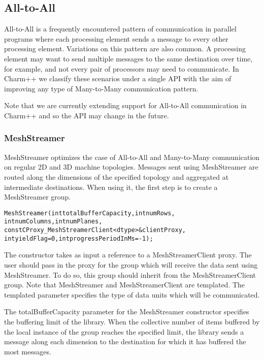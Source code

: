 \subsection{All-to-All}

All-to-All is a frequently encountered pattern of communication in
parallel programs where each processing element sends a message to
every other processing element. Variations on this pattern are also
common. A processing element may want to send multiple messages to the
same destination over time, for example, and not every pair of
processors may need to communicate. In Charm++ we classify these
scenarios under a single API with the aim of improving any type of
Many-to-Many communication pattern.

Note that we are currently extending support for All-to-All
communication in Charm++ and so the API may change in the
future. 

\subsubsection{MeshStreamer}

MeshStreamer optimizes the case of All-to-All and Many-to-Many
communication on regular 2D and 3D machine topologies. Messages sent
using MeshStreamer are routed along the dimensions of the specified
topology and aggregated at intermediate destinations. When using it,
the first step is to create a MeshStreamer group. 

\begin{alltt}
MeshStreamer(int totalBufferCapacity, int numRows, 
             int numColumns, int numPlanes, 
             const CProxy_MeshStreamerClient<dtype> &clientProxy,
             int yieldFlag = 0, int progressPeriodInMs = -1);
\end{alltt}

The constructor takes as input a reference to a MeshStreamerClient
proxy. The user should pass in the proxy for the group which will
receive the data sent using MeshStreamer. To do so, this group should
inherit from the MeshStreamerClient group. Note that MeshStreamer and
MeshStreamerClient are templated. The templated parameter specifies
the type of data units which will be communicated. 

The totalBufferCapacity parameter for the MeshStreamer constructor
specifies the buffering limit of the library. When the collective
number of items buffered by the local instance of the group reaches
the specified limit, the library sends a message along each dimension
to the destination for which it has buffered the most messages.

